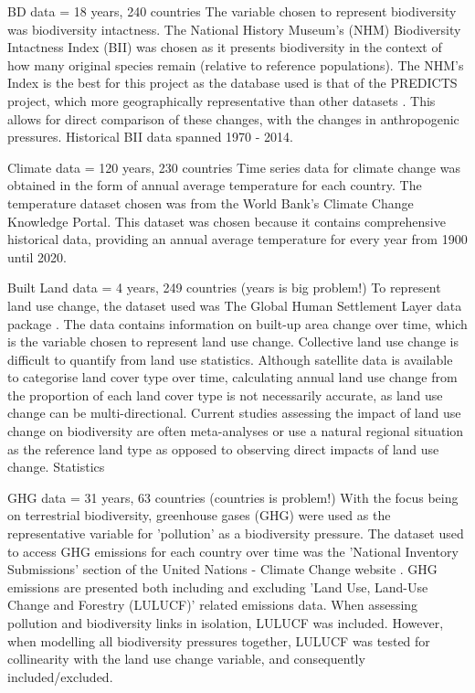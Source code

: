 \documentclass[11pt, a4paper, titlepage]{article}
\begin{document}
	BD data = 18 years, 240 countries
	The variable chosen to represent biodiversity was biodiversity intactness. The National History Museum's (NHM) Biodiversity Intactness Index (BII)\citep{phillips2021} was chosen as it presents biodiversity in the context of how many original species remain (relative to reference populations). The NHM's Index is the best for this project as the database used is that of the PREDICTS project, which more geographically representative than other datasets \citep{purvis2018modelling}. This allows for direct comparison of these changes, with the changes in anthropogenic pressures. Historical BII data spanned 1970 - 2014. \newline
	
	Climate data = 120 years, 230 countries
	Time series data for climate change was obtained in the form of annual average temperature for each country. The temperature dataset chosen was from the World Bank's Climate Change Knowledge Portal. This dataset was chosen because it contains comprehensive historical data, providing an annual average temperature for every year from 1900 until 2020. \newline
	
	Built Land data = 4 years, 249 countries (years is big problem!)
	To represent land use change, the dataset used was The Global Human Settlement Layer data package \citep{JRC117104}. The data contains information on built-up area change over time, which is the variable chosen to represent land use change. Collective land use change is difficult to quantify from land use statistics. Although satellite data is available to categorise land cover type over time, calculating annual land use change from the proportion of each land cover type is not necessarily accurate, as land use change can be multi-directional. Current studies assessing the impact of land use change on biodiversity are often meta-analyses or use a natural regional situation as the reference land type \citep{de2013land} as opposed to observing direct impacts of land use change. Statistics \newline
	
	GHG data = 31 years, 63 countries (countries is problem!)
	With the focus being on terrestrial biodiversity, greenhouse gases (GHG) were used as the representative variable for 'pollution' as a biodiversity pressure. The dataset used to access GHG emissions for each country over time was the 'National Inventory Submissions' section of the United Nations - Climate Change website \citep{united nations}. GHG emissions are presented both including and excluding 'Land Use, Land-Use Change and Forestry (LULUCF)' related emissions data. When assessing pollution and biodiversity links in isolation, LULUCF was included. However, when modelling all biodiversity pressures together, LULUCF was tested for collinearity with the land use change variable, and consequently included/excluded. \newline
	
\end{document}
